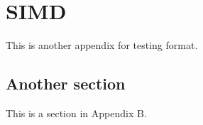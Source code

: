 \chapter{SIMD} \label{appendixB}

This is another appendix for testing format.

\section{Another section} \label{appBsect}

This is a section in Appendix B.
